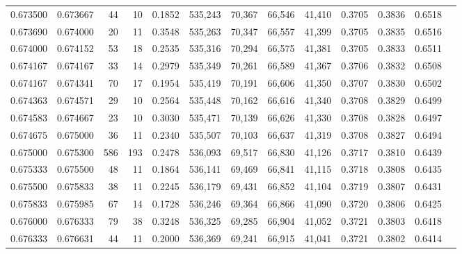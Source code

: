 \begin{tabular}{rrrrrrrrrrrrr}
0.673500 & 0.673667 &    44 &  10 &                                     0.1852 & 535,243 &  70,367 &  66,546 &  41,410 & 0.3705 & 0.3836 & 0.6518 \\
0.673690 & 0.674000 &    20 &  11 &                                     0.3548 & 535,263 &  70,347 &  66,557 &  41,399 & 0.3705 & 0.3835 & 0.6516 \\
0.674000 & 0.674152 &    53 &  18 &                                     0.2535 & 535,316 &  70,294 &  66,575 &  41,381 & 0.3705 & 0.3833 & 0.6511 \\
0.674167 & 0.674167 &    33 &  14 &                                     0.2979 & 535,349 &  70,261 &  66,589 &  41,367 & 0.3706 & 0.3832 & 0.6508 \\
0.674167 & 0.674341 &    70 &  17 &                                     0.1954 & 535,419 &  70,191 &  66,606 &  41,350 & 0.3707 & 0.3830 & 0.6502 \\
0.674363 & 0.674571 &    29 &  10 &                                     0.2564 & 535,448 &  70,162 &  66,616 &  41,340 & 0.3708 & 0.3829 & 0.6499 \\
0.674583 & 0.674667 &    23 &  10 &                                     0.3030 & 535,471 &  70,139 &  66,626 &  41,330 & 0.3708 & 0.3828 & 0.6497 \\
0.674675 & 0.675000 &    36 &  11 &                                     0.2340 & 535,507 &  70,103 &  66,637 &  41,319 & 0.3708 & 0.3827 & 0.6494 \\
0.675000 & 0.675300 &   586 & 193 &                                     0.2478 & 536,093 &  69,517 &  66,830 &  41,126 & 0.3717 & 0.3810 & 0.6439 \\
0.675333 & 0.675500 &    48 &  11 &                                     0.1864 & 536,141 &  69,469 &  66,841 &  41,115 & 0.3718 & 0.3808 & 0.6435 \\
0.675500 & 0.675833 &    38 &  11 &                                     0.2245 & 536,179 &  69,431 &  66,852 &  41,104 & 0.3719 & 0.3807 & 0.6431 \\
0.675833 & 0.675985 &    67 &  14 &                                     0.1728 & 536,246 &  69,364 &  66,866 &  41,090 & 0.3720 & 0.3806 & 0.6425 \\
0.676000 & 0.676333 &    79 &  38 &                                     0.3248 & 536,325 &  69,285 &  66,904 &  41,052 & 0.3721 & 0.3803 & 0.6418 \\
0.676333 & 0.676631 &    44 &  11 &                                     0.2000 & 536,369 &  69,241 &  66,915 &  41,041 & 0.3721 & 0.3802 & 0.6414 \\

\end{tabular}
